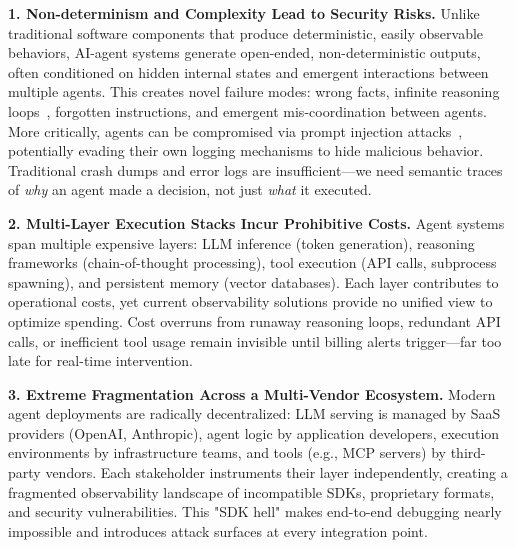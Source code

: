 \documentclass[sigplan,screen，review,9pt]{acmart}
\begin{document}
\textbf{1. Non-determinism and Complexity Lead to Security Risks.} Unlike traditional software components that produce deterministic, easily observable behaviors, AI-agent systems generate open-ended, non-deterministic outputs, often conditioned on hidden internal states and emergent interactions between multiple agents. This creates novel failure modes: wrong facts, infinite reasoning loops~\cite{zhang2024breakingagents}, forgotten instructions, and emergent mis-coordination between agents. More critically, agents can be compromised via prompt injection attacks~\cite{indirect-prompt-inject}, potentially evading their own logging mechanisms to hide malicious behavior. Traditional crash dumps and error logs are insufficient—we need semantic traces of \emph{why} an agent made a decision, not just \emph{what} it executed.

\textbf{2. Multi-Layer Execution Stacks Incur Prohibitive Costs.} Agent systems span multiple expensive layers: LLM inference (token generation), reasoning frameworks (chain-of-thought processing), tool execution (API calls, subprocess spawning), and persistent memory (vector databases). Each layer contributes to operational costs, yet current observability solutions provide no unified view to optimize spending. Cost overruns from runaway reasoning loops, redundant API calls, or inefficient tool usage remain invisible until billing alerts trigger—far too late for real-time intervention.

\textbf{3. Extreme Fragmentation Across a Multi-Vendor Ecosystem.} Modern agent deployments are radically decentralized: LLM serving is managed by SaaS providers (OpenAI, Anthropic), agent logic by application developers, execution environments by infrastructure teams, and tools (e.g., MCP servers) by third-party vendors. Each stakeholder instruments their layer independently, creating a fragmented observability landscape of incompatible SDKs, proprietary formats, and security vulnerabilities. This "SDK hell" makes end-to-end debugging nearly impossible and introduces attack surfaces at every integration point.
\end{document}

